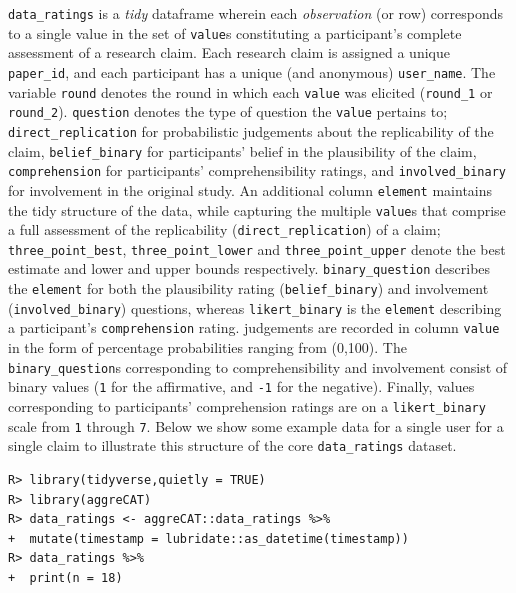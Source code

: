 \documentclass[article]{jss}
\begin{document}
\texttt{data\_ratings} is a \emph{tidy} dataframe wherein each
\emph{observation} (or row) corresponds to a single value in the set of
\texttt{value}s constituting a participant's complete assessment of a
research claim. Each research claim is assigned a unique
\texttt{paper\_id}, and each participant has a unique (and anonymous)
\texttt{user\_name}. The variable \texttt{round} denotes the round in
which each \texttt{value} was elicited (\texttt{round\_1} or
\texttt{round\_2}). \texttt{question} denotes the type of question the
\texttt{value} pertains to; \texttt{direct\_replication} for
probabilistic judgements about the replicability of the claim,
\texttt{belief\_binary} for participants' belief in the plausibility of
the claim, \texttt{comprehension} for participants' comprehensibility
ratings, and \texttt{involved\_binary} for involvement in the original
study. An additional column \texttt{element} maintains the tidy
structure of the data, while capturing the multiple \texttt{value}s that
comprise a full assessment of the replicability
(\texttt{direct\_replication}) of a claim; \texttt{three\_point\_best},
\texttt{three\_point\_lower} and \texttt{three\_point\_upper} denote the
best estimate and lower and upper bounds respectively.
\texttt{binary\_question} describes the \texttt{element} for both the
plausibility rating (\texttt{belief\_binary}) and involvement
(\texttt{involved\_binary}) questions, whereas \texttt{likert\_binary}
is the \texttt{element} describing a participant's
\texttt{comprehension} rating. judgements are recorded in column
\texttt{value} in the form of percentage probabilities ranging from
(0,100). The \texttt{binary\_question}s corresponding to
comprehensibility and involvement consist of binary values (\texttt{1}
for the affirmative, and \texttt{-1} for the negative). Finally, values
corresponding to participants' comprehension ratings are on a
\texttt{likert\_binary} scale from \texttt{1} through \texttt{7}. Below
we show some example data for a single user for a single claim to
illustrate this structure of the core \texttt{data\_ratings} dataset.

\begin{verbatim}
R> library(tidyverse,quietly = TRUE)
R> library(aggreCAT)
R> data_ratings <- aggreCAT::data_ratings %>% 
+  mutate(timestamp = lubridate::as_datetime(timestamp))
R> data_ratings %>% 
+  print(n = 18)
\end{verbatim}
\end{document}
